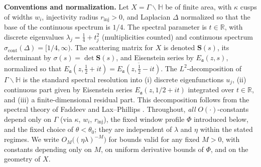 \medskip
\noindent\textbf{Conventions and normalization.}
Let $X=\Gamma\backslash\mathbb{H}$ be of finite area, with $\kappa$ cusps of widths $w_i$, injectivity radius $r_{\mathrm{inj}}>0$, and Laplacian $\Delta$ normalized so that the base of the continuous spectrum is $1/4$. The spectral parameter is $t\in\mathbb{R}$, with discrete eigenvalues $\lambda_j=\tfrac14+t_j^2$ (multiplicities counted) and continuous spectrum $\sigma_{\mathrm{cont}}(\Delta)=[1/4,\infty)$. The scattering matrix for $X$ is denoted $\mathbf{S}(s)$, its determinant by $\sigma(s)=\det\mathbf{S}(s)$, and Eisenstein series by $E_\mathfrak{a}(z,s)$, normalized so that $E_\mathfrak{a}(z,\tfrac12+it)=\overline{E_\mathfrak{a}(z,\tfrac12-it)}$. The $L^2$-decomposition of $\Gamma\backslash\mathbb{H}$ is the standard spectral resolution into (i) discrete eigenfunctions $u_j$, (ii) continuous part given by Eisenstein series $E_\mathfrak{a}(z,1/2+it)$ integrated over $t\in\mathbb{R}$, and (iii) a finite-dimensional residual part. This decomposition follows from the spectral theory of Faddeev \cite{Faddeev1967} and Lax--Phillips \cite{LaxPhillips1976}. Throughout, \emph{all} $O(\cdot)$-constants depend only on $\Gamma$ (via $\kappa$, ${w_i}$, $r_{\mathrm{inj}}$), the fixed window profile $\Phi$ introduced below, and the fixed choice of $\theta<\theta_0$; they are independent of $\lambda$ and $\eta$ within the stated regimes. We write $O_M\!\big((\eta\lambda)^{-M}\big)$ for bounds valid for any fixed $M>0$, with constants depending only on $M$, on uniform derivative bounds of $\Phi$, and on the geometry of $X$.


